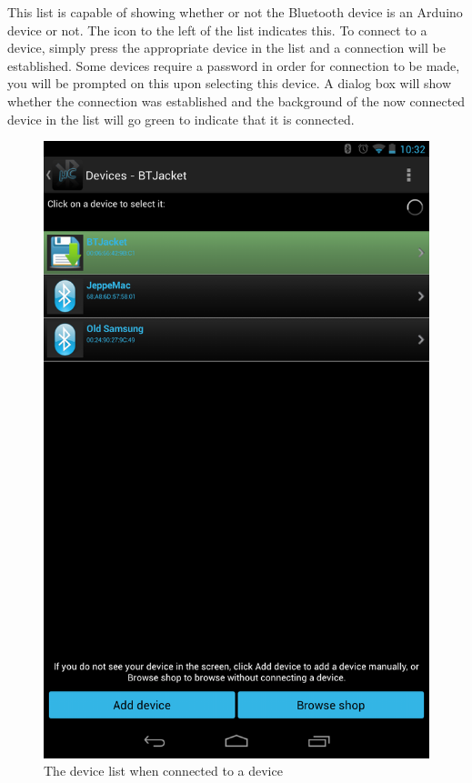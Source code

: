 This list is capable of showing whether or not the Bluetooth device is an Arduino device or not. The icon to the left of the list indicates this.
To connect to a device, simply press the appropriate device in the list and a connection will be established. Some devices require a password in order for connection to be made, you will be prompted on this upon selecting this device. A dialog box will show whether the connection was established and the background of the now connected device in the list will go green to indicate that it is connected. \\
\newline
\newline
\begin{figure}[H]
	\centering
	\includegraphics[scale = 0.3]{images/Screenshots/connected.png}
	\caption{The device list when connected to a device}
\end{figure}

